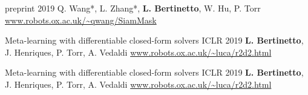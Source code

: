 


\begin{cvpapers}
    {preprint} %
    {2019} %
  \cvpaperauthors
    {Q. Wang*, L. Zhang*, \textbf{L. Bertinetto}, W. Hu, P. Torr}
    {} %
    {} %
  \cvpaperurl
    {\href{http://www.robots.ox.ac.uk/~qwang/SiamMask/}{www.robots.ox.ac.uk/\textasciitilde qwang/SiamMask}}
    {} %
    {} %

  \cvpapertitle
    {Meta-learning with differentiable closed-form solvers} %
    {ICLR} %
    {2019} %
  \cvpaperauthors
    {\textbf{L. Bertinetto}, J. Henriques, P. Torr, A. Vedaldi}
    {} %
    {} %
  \cvpaperurl
    {\href{http://www.robots.ox.ac.uk/~luca/r2d2.html}{www.robots.ox.ac.uk/\textasciitilde luca/r2d2.html}}
    {} %
    {} %


  \cvpapertitle
    {Meta-learning with differentiable closed-form solvers} %
    {ICLR} %
    {2019} %
  \cvpaperauthors
    {\textbf{L. Bertinetto}, J. Henriques, P. Torr, A. Vedaldi}
    {} %
    {} %
  \cvpaperurl
    {\href{http://www.robots.ox.ac.uk/~luca/r2d2.html}{www.robots.ox.ac.uk/\textasciitilde luca/r2d2.html}}
    {} %
    {} %


\end{cvpapers}
